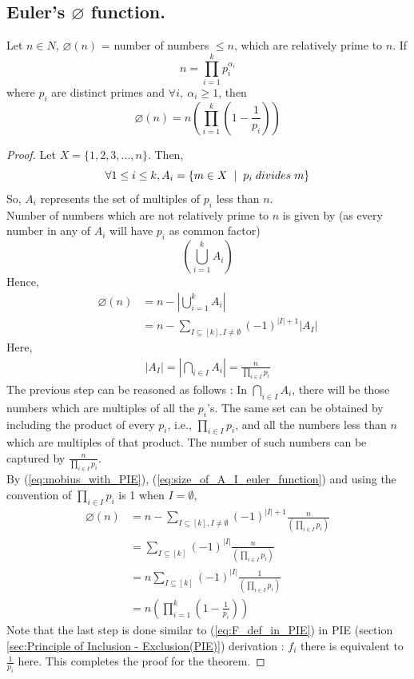 \subsection{Euler's $\varnothing$ function.} \label{subsec:euler's function application}
\begin{theorem}
Let $n \in N$, $\varnothing (n)$ = number of numbers $\leq n$, which are relatively prime to $n$. If $$n=\prod_{i=1}^{k}p_i^{\alpha_i}$$ where $p_i$ are distinct primes and $\forall i,~ \alpha_i \geq 1$, then $$\varnothing(n) = n(\prod_{i=1}^{k}(1-\frac{1}{p_i}))$$
\end{theorem}
\begin{proof}
Let $X=\{1,2,3,...,n\}$. Then,
\[
\forall 1 \leq i \leq k, A_i = \{m\in X \hspace{0.2cm}|\hspace{0.2cm} p_i \hspace{0.1cm}divides \hspace{0.1cm}m\}
\]
So, $A_i$ represents the set of multiples of $p_i$ less than $n$.\\
Number of numbers which are not relatively prime to $n$ is given by (as every number in any of $A_i$ will have $p_i$ as common factor)
$$(\bigcup_{i=1}^{k} A_i)$$
Hence, 
\begin{align}
\varnothing (n) &= n - |\bigcup_{i=1}^{k}A_i| \tag{apply PIE}
\nonumber \\
&=n- \sum_{I \subseteq [k], I \neq \emptyset} (-1)^{|I|+1}|A_I| \label{eq:mobius_with_PIE}
\end{align}
Here, 
\begin{align}
|A_I| = |\bigcap_{i \in I}A_i| = \frac{n}{\prod_{i \in I}p_i} \label{eq:size_of_A_I_euler_function}
\end{align}
The previous step can be reasoned as follows : In $\bigcap_{i \in I}A_i$, there will be those numbers which are multiples of all the $p_i$'s. The same set can be obtained by including the product of every $p_i$, i.e., $\prod_{i \in I}p_i$, and all the numbers less than $n$ which are multiples of that product. The number of such numbers can be captured by $\frac{n}{\prod_{i \in I}p_i}$.\\
By (\ref{eq:mobius_with_PIE}), (\ref{eq:size_of_A_I_euler_function}) and using the convention of $\prod_{i \in I}p_i$ is 1 when $I=\emptyset$, 
\begin{align*}
\varnothing (n) &= n - \sum_{I \subseteq [k], I \neq \emptyset} (-1)^{|I|+1}\frac{n}{(\prod_{i \in I}p_i)}\\
&= \sum_{I \subseteq [k]} (-1)^{|I|}\frac{n}{(\prod_{i \in I}p_i)}\\
&= n\sum_{I \subseteq [k]} (-1)^{|I|}\frac{1}{(\prod_{i \in I}p_i)}\\
&=n(\prod_{i=1}^{k}(1-\frac{1}{p_i}))
\end{align*}
Note that the last step is done similar to  (\ref{eq:F_def_in_PIE}) in PIE (section \ref{sec:Principle of Inclusion - Exclusion(PIE)}) derivation : $f_i$ there is equivalent to $\frac{1}{p_i}$ here. This completes the proof for the theorem.
\end{proof}
